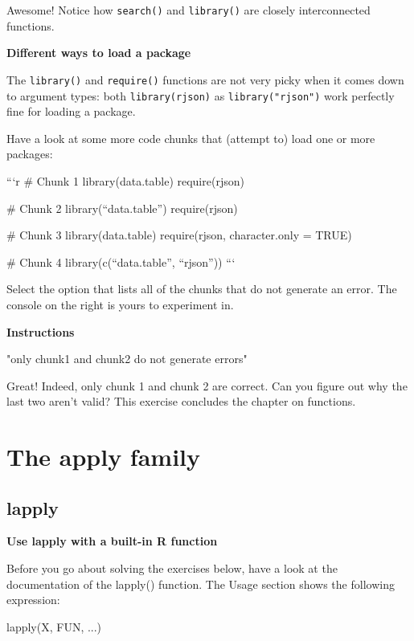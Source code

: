 \documentclass[]{article}
\newcommand{\hlstd}[1]{\textcolor[rgb]{0.251,0.251,0.251}{#1}}%
\newcommand{\hlkwd}[1]{\textcolor[rgb]{0.878,0.439,0.125}{#1}}%
\newenvironment{Shaded}{\begin{myshaded}}{\end{myshaded}}
\renewenvironment{verbatim}{\color{codecolor}\begin{myshaded}\begin{oldverbatim}}{\end{oldverbatim}\end{myshaded}}
\newcommand{\KeywordTok}[1]{\hlkwd{#1}}
\newcommand{\NormalTok}[1]{\hlstd{#1}}
\begin{document}
Awesome! Notice how \texttt{search()} and \texttt{library()} are closely
interconnected functions.

\textbf{Different ways to load a package}

The \texttt{library()} and \texttt{require()} functions are not very
picky when it comes down to argument types: both \texttt{library(rjson)}
as \texttt{library("rjson")} work perfectly fine for loading a package.

Have a look at some more code chunks that (attempt to) load one or more
packages:

```r \# Chunk 1 library(data.table) require(rjson)

\# Chunk 2 library(``data.table'') require(rjson)

\# Chunk 3 library(data.table) require(rjson, character.only = TRUE)

\# Chunk 4 library(c(``data.table'', ``rjson'')) ```

Select the option that lists all of the chunks that do not generate an
error. The console on the right is yours to experiment in.

\textbf{Instructions}

\begin{verbatim}
   [1] "only chunk1 and chunk2 do not generate errors"
\end{verbatim}

Great! Indeed, only chunk 1 and chunk 2 are correct. Can you figure out
why the last two aren't valid? This exercise concludes the chapter on
functions.

\section{The apply family}\label{the-apply-family}

\subsection{lapply}\label{lapply}

\textbf{Use lapply with a built-in R function}

Before you go about solving the exercises below, have a look at the
documentation of the lapply() function. The Usage section shows the
following expression:

\begin{Shaded}
\begin{Highlighting}[]
\KeywordTok{lapply}\NormalTok{(X, FUN, ...)}
\end{Highlighting}
\end{Shaded}
\end{document}
